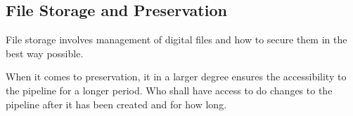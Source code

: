  
\subsection{File Storage and Preservation}
File storage involves management of digital files and how to secure them in the best way possible.

When it comes to preservation, it in a larger degree ensures the accessibility to the pipeline for a longer period. Who shall have access to do changes to the pipeline after it has been created and for how long. 


